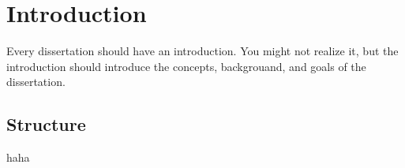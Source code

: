 \chapter{Introduction}

Every dissertation should have an introduction.  You might not realize
it, but the introduction should introduce the concepts, backgrouand,
and goals of the dissertation.

\section{Structure}
haha
